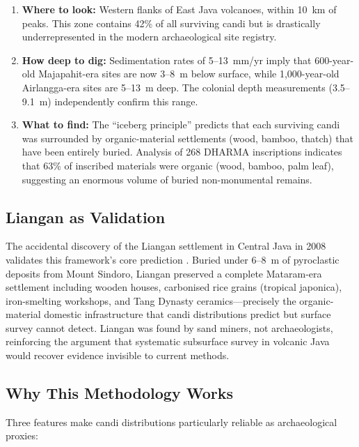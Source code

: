 \documentclass[12pt,a4paper]{article}
\begin{document}
\begin{enumerate}
    \item \textbf{Where to look:} Western flanks of East Java volcanoes, within 10~km of peaks. This zone contains 42\% of all surviving candi but is drastically underrepresented in the modern archaeological site registry.
    \item \textbf{How deep to dig:} Sedimentation rates of 5--13~mm/yr imply that 600-year-old Majapahit-era sites are now 3--8~m below surface, while 1,000-year-old Airlangga-era sites are 5--13~m deep. The colonial depth measurements (3.5--9.1~m) independently confirm this range.
    \item \textbf{What to find:} The ``iceberg principle'' predicts that each surviving candi was surrounded by organic-material settlements (wood, bamboo, thatch) that have been entirely buried. Analysis of 268 DHARMA inscriptions indicates that 63\% of inscribed materials were organic (wood, bamboo, palm leaf), suggesting an enormous volume of buried non-monumental remains.
\end{enumerate}

\subsection{Liangan as Validation}

The accidental discovery of the Liangan settlement in Central Java in 2008 validates this framework's core prediction \citep{abbas2016}. Buried under 6--8~m of pyroclastic deposits from Mount Sindoro, Liangan preserved a complete Mataram-era settlement including wooden houses, carbonised rice grains (tropical japonica), iron-smelting workshops, and Tang Dynasty ceramics---precisely the organic-material domestic infrastructure that candi distributions predict but surface survey cannot detect. Liangan was found by sand miners, not archaeologists, reinforcing the argument that systematic subsurface survey in volcanic Java would recover evidence invisible to current methods.

\subsection{Why This Methodology Works}

Three features make candi distributions particularly reliable as archaeological proxies:
\end{document}

